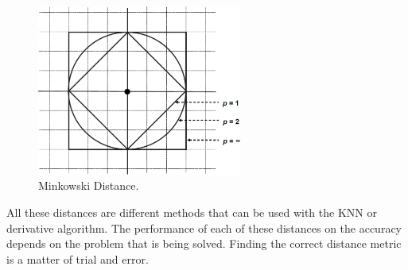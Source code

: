 \begin{figure}[H]
\centering
\includegraphics[width=0.6\textwidth]{Figures/minkowskiDistance}
\decoRule
\caption[Minkowski Distance]{Minkowski Distance. \cite{minkowskiDistance}}
\label{fig:minkowskiDistance}
\end{figure}

\noindent All these distances are different methods that can be used with the KNN or derivative algorithm. The performance of each of these distances on the accuracy depends on the problem that is being solved. Finding the correct distance metric is a matter of trial and error.

